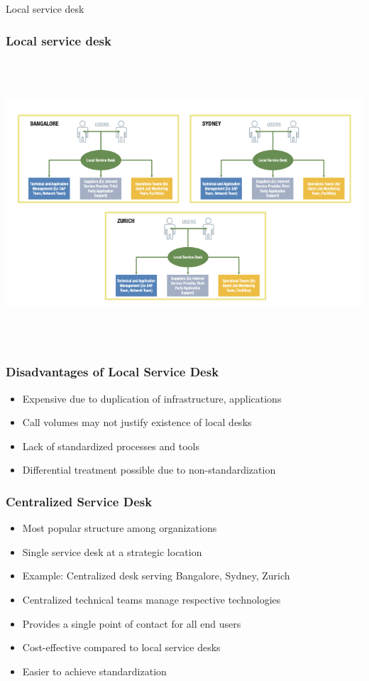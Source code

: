 \documentclass[aspectratio=169, table]{beamer}
\begin{document}
\begin{frame}{Local service desk} 	 \frametitle{Local service desk} \begin{center} 	\includegraphics[width=0.8\linewidth]{images/image-02.png} \end{center} \end{frame}

\begin{frame}
	\frametitle{Disadvantages of Local Service Desk}
	\begin{itemize}
		\item Expensive due to duplication of infrastructure, applications
		\item Call volumes may not justify existence of local desks
		\item Lack of standardized processes and tools
		\item Differential treatment possible due to non-standardization
	\end{itemize}
\end{frame}

\begin{frame}
	\frametitle{Centralized Service Desk}
	\begin{itemize}
		\item Most popular structure among organizations
		\item Single service desk at a strategic location
		\item Example: Centralized desk serving Bangalore, Sydney, Zurich
		\item Centralized technical teams manage respective technologies
		\item Provides a single point of contact for all end users
		\item Cost-effective compared to local service desks
		\item Easier to achieve standardization
	\end{itemize}
\end{frame}
\end{document}
